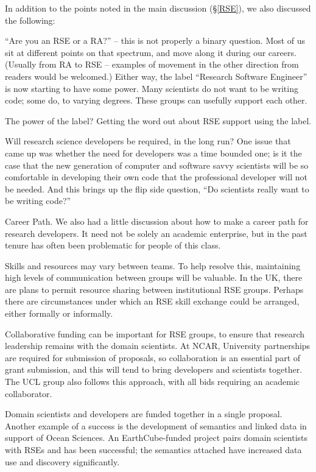 In addition to the points noted in the main discussion (\S\ref{RSE}), we also
discussed the following:

``Are you an RSE or a RA?'' -- this is not properly a binary question. Most of
us sit at different points on that spectrum, and move along it during our
careers. (Usually from RA to RSE -- examples of movement in the other direction
from readers would be welcomed.)
Either way, the label ``Research Software Engineer'' is now starting to
have some power. Many scientists do not want to be writing code; some do, to
varying degrees. These groups can usefully support each other.

The power of the label? Getting the word out about RSE support using the label.

Will research science developers be required, in the long run?
One issue that came up was whether the need for developers was a time bounded one; is it the case that the new generation of computer and software savvy scientists will be so comfortable in developing their own code that the professional developer will not be needed. And this brings up the flip side question, ``Do scientists really want to be writing code?''

Career Path.
We also had a little discussion about how to make a career path for research developers. It need not be solely an academic enterprise, but in the past tenure has often been problematic for people of this class.

Skills and resources may vary between teams. To help resolve this, maintaining
high levels of communication between groups will be valuable. In the UK, there
are plans to permit resource sharing between institutional RSE groups. Perhaps 
there are circumstances under which an RSE skill exchange could be arranged, either
formally or informally. 

Collaborative funding can be important for RSE groups, to ensure that research
leadership remains with the domain scientists. At NCAR, University partnerships
are required for submission of proposals, so collaboration is an essential part
of grant submission, and this will tend to bring developers and
scientists together. The UCL group also follows this approach, with all bids
requiring an academic collaborator.

Domain scientists and developers are funded together in a single proposal.
Another example of a success is the development of semantics and linked data in
support of Ocean Sciences. An EarthCube-funded project pairs domain scientists
with RSEs and has been successful; the semantics attached have increased data
use and discovery significantly.


